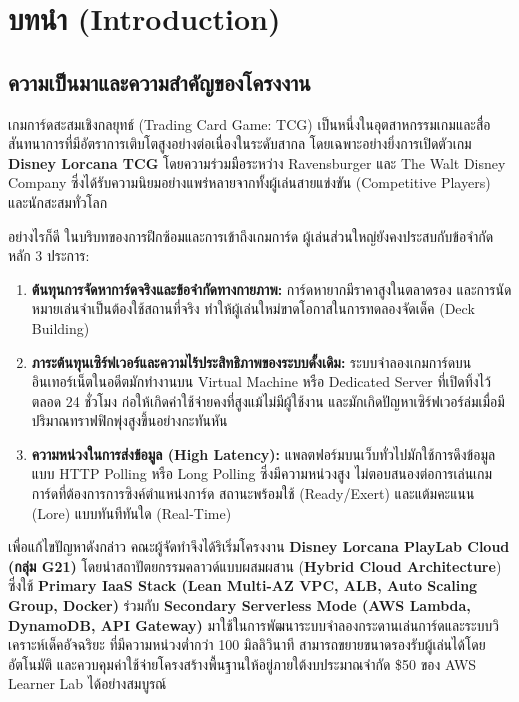 \documentclass[12pt,a4paper]{report}
\begin{document}
\chapter{บทนำ (Introduction)}

\section{ความเป็นมาและความสำคัญของโครงงาน}
เกมการ์ดสะสมเชิงกลยุทธ์ (Trading Card Game: TCG) เป็นหนึ่งในอุตสาหกรรมเกมและสื่อสันทนาการที่มีอัตราการเติบโตสูงอย่างต่อเนื่องในระดับสากล โดยเฉพาะอย่างยิ่งการเปิดตัวเกม \textbf{Disney Lorcana TCG} โดยความร่วมมือระหว่าง Ravensburger และ The Walt Disney Company ซึ่งได้รับความนิยมอย่างแพร่หลายจากทั้งผู้เล่นสายแข่งขัน (Competitive Players) และนักสะสมทั่วโลก

อย่างไรก็ดี ในบริบทของการฝึกซ้อมและการเข้าถึงเกมการ์ด ผู้เล่นส่วนใหญ่ยังคงประสบกับข้อจำกัดหลัก 3 ประการ:
\begin{enumerate}
    \item \textbf{ต้นทุนการจัดหาการ์ดจริงและข้อจำกัดทางกายภาพ:} การ์ดหายากมีราคาสูงในตลาดรอง และการนัดหมายเล่นจำเป็นต้องใช้สถานที่จริง ทำให้ผู้เล่นใหม่ขาดโอกาสในการทดลองจัดเด็ค (Deck Building)
    \item \textbf{ภาระต้นทุนเซิร์ฟเวอร์และความไร้ประสิทธิภาพของระบบดั้งเดิม:} ระบบจำลองเกมการ์ดบนอินเทอร์เน็ตในอดีตมักทำงานบน Virtual Machine หรือ Dedicated Server ที่เปิดทิ้งไว้ตลอด 24 ชั่วโมง ก่อให้เกิดค่าใช้จ่ายคงที่สูงแม้ไม่มีผู้ใช้งาน และมักเกิดปัญหาเซิร์ฟเวอร์ล่มเมื่อมีปริมาณทราฟฟิกพุ่งสูงขึ้นอย่างกะทันหัน
    \item \textbf{ความหน่วงในการส่งข้อมูล (High Latency):} แพลตฟอร์มบนเว็บทั่วไปมักใช้การดึงข้อมูลแบบ HTTP Polling หรือ Long Polling ซึ่งมีความหน่วงสูง ไม่ตอบสนองต่อการเล่นเกมการ์ดที่ต้องการการซิงค์ตำแหน่งการ์ด สถานะพร้อมใช้ (Ready/Exert) และแต้มคะแนน (Lore) แบบทันทีทันใด (Real-Time)
\end{enumerate}

เพื่อแก้ไขปัญหาดังกล่าว คณะผู้จัดทำจึงได้ริเริ่มโครงงาน \textbf{Disney Lorcana PlayLab Cloud (กลุ่ม G21)} โดยนำสถาปัตยกรรมคลาวด์แบบผสมผสาน (\textbf{Hybrid Cloud Architecture}) ซึ่งใช้ \textbf{Primary IaaS Stack (Lean Multi-AZ VPC, ALB, Auto Scaling Group, Docker)} ร่วมกับ \textbf{Secondary Serverless Mode (AWS Lambda, DynamoDB, API Gateway)} มาใช้ในการพัฒนาระบบจำลองกระดานเล่นการ์ดและระบบวิเคราะห์เด็คอัจฉริยะ ที่มีความหน่วงต่ำกว่า 100 มิลลิวินาที สามารถขยายขนาดรองรับผู้เล่นได้โดยอัตโนมัติ และควบคุมค่าใช้จ่ายโครงสร้างพื้นฐานให้อยู่ภายใต้งบประมาณจำกัด \$50 ของ AWS Learner Lab ได้อย่างสมบูรณ์
\end{document}
